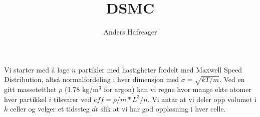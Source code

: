\documentclass{article}
\begin{document}
\author{Anders Hafreager}
\title{DSMC}
\maketitle
Vi starter med å lage $n$ partikler med hastigheter fordelt med Maxwell Speed Distribution, altså normalfordeling i hver dimensjon med $\sigma = \sqrt{kT/m}$. Ved en gitt massetetthet $\rho$ (1.78 kg/m$^3$ for argon) kan vi regne hvor mange ekte atomer hver partikkel $i$ tilsvarer ved $eff = \rho/m*L^3/n$. 
Vi antar at vi deler opp volumet i $k$ celler og velger et tidssteg $dt$ slik at vi har god oppløsning i hver celle.
\end{document}
